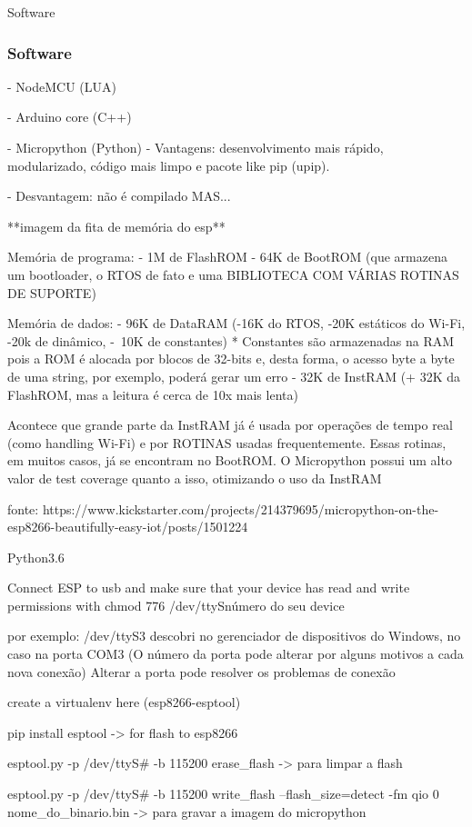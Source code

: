 \documentclass[10pt, compress]{beamer}
\begin{document}
\begin{frame}{Software}
  \frametitle{Software}

  - NodeMCU (LUA)

  - Arduino core (C++)

  - Micropython (Python)
    - Vantagens: desenvolvimento mais rápido, modularizado, código mais limpo e pacote like pip (upip).

    - Desvantagem: não é compilado MAS... 
      
    **imagem da fita de memória do esp**

    Memória de programa:
      - 1M de FlashROM
      - 64K de BootROM (que armazena um bootloader, o RTOS de fato e uma BIBLIOTECA COM VÁRIAS ROTINAS DE SUPORTE)

    Memória de dados:
      - 96K de DataRAM (-16K do RTOS, -20K estáticos do Wi-Fi, -20k de dinâmico, -~10K de constantes)
      * Constantes são armazenadas na RAM pois a ROM é alocada por blocos de 32-bits e, desta forma, o acesso byte a byte de uma string, por exemplo, poderá gerar um erro
      - 32K de InstRAM (+ 32K da FlashROM, mas a leitura é cerca de 10x mais lenta)

      Acontece que grande parte da InstRAM já é usada por operações de tempo real (como handling Wi-Fi) e por ROTINAS usadas frequentemente.
      Essas rotinas, em muitos casos, já se encontram no BootROM. O Micropython possui um alto valor de test coverage quanto a isso, otimizando o uso da InstRAM

  fonte: https://www.kickstarter.com/projects/214379695/micropython-on-the-esp8266-beautifully-easy-iot/posts/1501224 
    



  Python3.6

  Connect ESP to usb and make sure that your device has read and write permissions with 
  chmod 776 /dev/ttyS{número do seu device}

  por exemplo: /dev/ttyS3
  descobri no gerenciador de dispositivos do Windows, no caso na porta COM3 (O número da porta pode alterar por alguns motivos a cada nova conexão)
  Alterar a porta pode resolver os problemas de conexão 

  create a virtualenv here (esp8266-esptool)

  pip install esptool -> for flash to esp8266 

  esptool.py -p /dev/ttyS# -b 115200 erase\_flash -> para limpar a flash

  esptool.py -p /dev/ttyS# -b 115200 write\_flash --flash\_size=detect -fm qio 0 nome\_do\_binario.bin -> para gravar a imagem do micropython


\end{frame}
\end{document}
